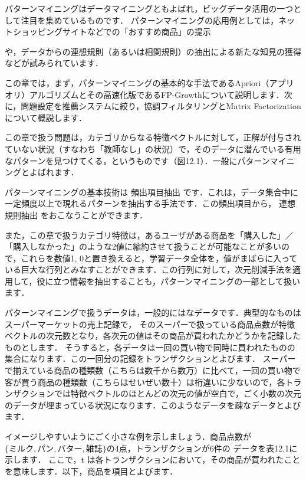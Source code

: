 

パターンマイニングはデータマイニングともよばれ，ビッグデータ活用の一つとして注目を集めているものです．
パターンマイニングの応用例としては，ネットショッピングサイトなどでの「おすすめ商品」の提示

や，データからの連想規則（あるいは相関規則）の抽出による新たな知見の獲得などが試みられています．

この章では，まず，パターンマイニングの基本的な手法であるApriori（アプリオリ）アルゴリズムとその高速化版であるFP-Growthについて説明します．次に，問題設定を推薦システムに絞り，協調フィルタリングとMatrix Factorizationについて概説します．


この章で扱う問題は，カテゴリからなる特徴ベクトルに対して，正解が付与されていない状況（すなわち「教師なし」の状況）で，そのデータに潜んでいる有用なパターンを見つけてくる，というものです（図12.1）．一般にパターンマイニングとよばれます．


パターンマイニングの基本技術は
頻出項目抽出
です．これは，データ集合中に一定頻度以上で現れるパターンを抽出する手法です．この頻出項目から，
連想規則抽出
をおこなうことができます．


また，この章で扱うカテゴリ特徴は，あるユーザがある商品を「購入した」／「購入しなかった」のような2値に縮約させて扱うことが可能なことが多いので，これらを数値1, 0と置き換えると，学習データ全体を，値がまばらに入っている巨大な行列とみなすことができます．この行列に対して，次元削減手法を適用して，役に立つ情報を抽出することも，パターンマイニングの一部として扱います．


パターンマイニングで扱うデータは，一般的にはなデータです．典型的なものはスーパーマーケットの売上記録で，
そのスーパーで扱っている商品点数が特徴ベクトルの次元数となり，各次元の値はその商品が買われたかどうかを記録したものとします．
そうすると，各データは一回の買い物で同時に買われたものの集合になります．この一回分の記録をトランザクションとよびます．
スーパーで揃えている商品の種類数（こちらは数千から数万）に比べて，一回の買い物で客が買う商品の種類数（こちらはせいぜい数十）は桁違いに少ないので，各トランザクションでは特徴ベクトルのほとんどの次元の値が空白で，ごく小数の次元のデータが埋まっている状況になります．このようなデータを疎なデータとよびます．

イメージしやすいようにごく小さな例を示しましょう．商品点数が$\{ミルク, パン, バター, 雑誌\}$の4点，トランザクションが6件の
データを表12.1に示します．
ここで，t は各トランザクションにおいて，その商品が買われたことを意味します．以下，商品を項目とよびます．

